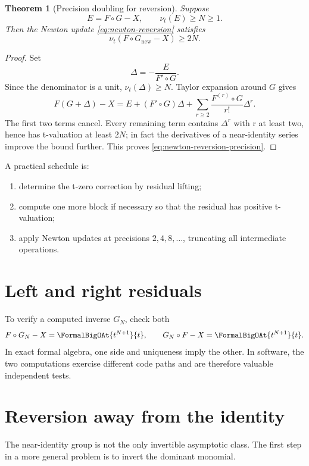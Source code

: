 \documentclass[11pt,openany]{book}
\theoremstyle{definition}
\theoremstyle{plain}
\newtheorem{theorem}{Theorem}[chapter]
\theoremstyle{remark}
\newcommand{\val}{\nu}
\newcommand{\compose}{\mathbin{\circ}}
\begin{document}
\begin{theorem}[Precision doubling for reversion]\label{thm:newton-reversion}
Suppose
\[
 E=F\compose G-X,
 \qquad \val_t(E)\ge N\ge1.
\]
Then the Newton update \cref{eq:newton-reversion} satisfies
\begin{equation}\label{eq:newton-reversion-precision}
 \val_t(F\compose G_{\mathrm{new}}-X)\ge2N.
\end{equation}
\end{theorem}
\begin{proof}
Set
\[
 \Delta=-\frac{E}{F'\compose G}.
\]
Since the denominator is a unit, \(\val_t(\Delta)\ge N\).  Taylor expansion
around \(G\) gives
\[
 F(G+\Delta)-X
 =E+(F'\compose G)\Delta
 +\sum_{r\ge2}\frac{F^{(r)}\compose G}{r!}\Delta^r.
\]
The first two terms cancel.  Every remaining term contains \(\Delta^r\) with
r at least two, hence has t-valuation at least \(2N\); in fact the derivatives
of a near-identity series improve the bound further.  This proves
\cref{eq:newton-reversion-precision}.
\end{proof}

A practical schedule is:
\begin{enumerate}
\item determine the t-zero correction by residual lifting;
\item compute one more block if necessary so that the residual has positive
      t-valuation;
\item apply Newton updates at precisions \(2,4,8,\ldots\), truncating all
      intermediate operations.
\end{enumerate}

\section{Left and right residuals}
To verify a computed inverse \(G_N\), check both
\begin{equation}\label{eq:two-residuals}
 F\compose G_N-X=\FormalBigOAt{t^{N+1}}{t},
 \qquad
 G_N\compose F-X=\FormalBigOAt{t^{N+1}}{t}.
\end{equation}
In exact formal algebra, one side and uniqueness imply the other.  In software,
the two computations exercise different code paths and are therefore valuable
independent tests.

\section{Reversion away from the identity}
The near-identity group is not the only invertible asymptotic class.  The first
step in a more general problem is to invert the dominant monomial.
\end{document}
